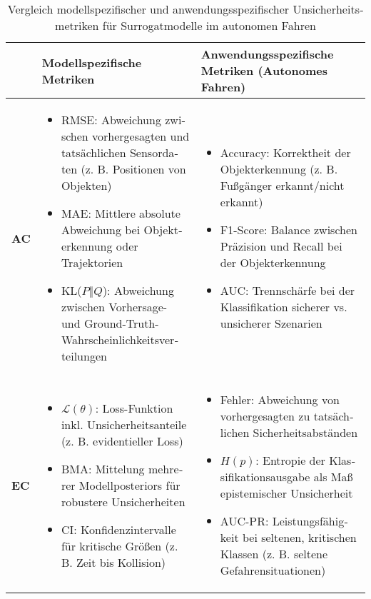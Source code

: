 \begin{otherlanguage}{ngerman}
\begin{table}[!htpb]
  \centering
  \scriptsize
  \begin{tabularx}{\textwidth}{|l|X|X|}
    \hline
    & \textbf{Modellspezifische Metriken} & \textbf{Anwendungsspezifische Metriken (Autonomes Fahren)} \\
    \hline
    \textbf{AC} &
    \begin{itemize}[leftmargin=*,noitemsep,topsep=0pt]
      \item RMSE: Abweichung zwischen vorhergesagten und tatsächlichen Sensordaten (z. B. Positionen von Objekten)
      \item MAE: Mittlere absolute Abweichung bei Objekterkennung oder Trajektorien
      \item KL($P\Vert Q$): Abweichung zwischen Vorhersage- und Ground-Truth-Wahrscheinlichkeitsverteilungen
    \end{itemize}
    &
    \begin{itemize}[leftmargin=*,noitemsep,topsep=0pt]
      \item Accuracy: Korrektheit der Objekterkennung (z. B. Fußgänger erkannt/nicht erkannt)
      \item F1-Score: Balance zwischen Präzision und Recall bei der Objekterkennung
      \item AUC: Trennschärfe bei der Klassifikation sicherer vs. unsicherer Szenarien
    \end{itemize}
    \\
    \hline
    \textbf{EC} &
    \begin{itemize}[leftmargin=*,noitemsep,topsep=0pt]
      \item $\mathcal{L}(\theta)$: Loss-Funktion inkl. Unsicherheitsanteile (z. B. evidentieller Loss)
      \item BMA: Mittelung mehrerer Modellposteriors für robustere Unsicherheiten
      \item CI: Konfidenzintervalle für kritische Größen (z. B. Zeit bis Kollision)
    \end{itemize}
    &
    \begin{itemize}[leftmargin=*,noitemsep,topsep=0pt]
      \item Fehler: Abweichung von vorhergesagten zu tatsächlichen Sicherheitsabständen
      \item $H(p)$: Entropie der Klassifikationsausgabe als Maß epistemischer Unsicherheit
      \item AUC-PR: Leistungsfähigkeit bei seltenen, kritischen Klassen (z. B. seltene Gefahrensituationen)
    \end{itemize}
    \\
    \hline
  \end{tabularx}
  \caption{Vergleich modellspezifischer und anwendungsspezifischer Unsicherheitsmetriken für Surrogatmodelle im autonomen Fahren}
  \label{tab:chapter6r71}
\end{table}


\end{otherlanguage}
